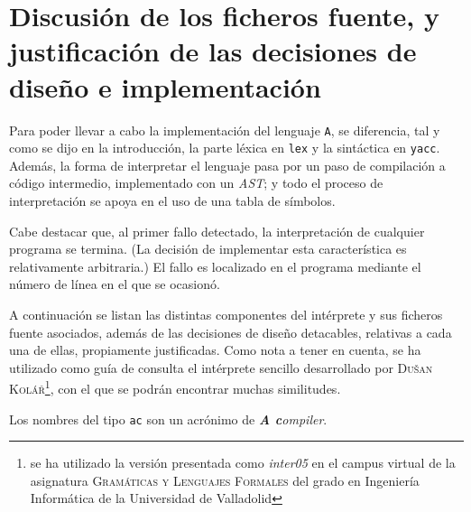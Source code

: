 \documentclass[12pt]{article}
\begin{document}
\section{Discusión de los ficheros fuente, y justificación de las decisiones de diseño e implementación}
Para poder llevar a cabo la implementación del lenguaje \texttt{A}, se diferencia, tal y como se dijo en la introducción, la parte léxica en \texttt{lex} y la sintáctica en \texttt{yacc}. Además, la forma de interpretar el lenguaje pasa por un paso de compilación a código intermedio, implementado con un \textit{AST}; y todo el proceso de interpretación se apoya en el uso de una tabla de símbolos.\par
Cabe destacar que, al primer fallo detectado, la interpretación de cualquier programa se termina. (La decisión de implementar esta característica es relativamente arbitraria.) El fallo es localizado en el programa mediante el número de línea en el que se ocasionó.
\par
A continuación se listan las distintas componentes del intérprete y sus ficheros fuente asociados, además de las decisiones de diseño detacables, relativas a cada una de ellas, propiamente justificadas. Como nota a tener en cuenta, se ha utilizado como guía de consulta el intérprete sencillo desarrollado por \textsc{Dušan Kolář}\footnote{se ha utilizado la versión presentada como \textit{inter05} en el campus virtual de la asignatura \textsc{Gramáticas y Lenguajes Formales} del grado en Ingeniería Informática de la Universidad de Valladolid}, con el que se podrán encontrar muchas similitudes.\par
Los nombres del tipo \texttt{ac} son un acrónimo de \textit{\textbf{A c}ompiler}.
\end{document}
